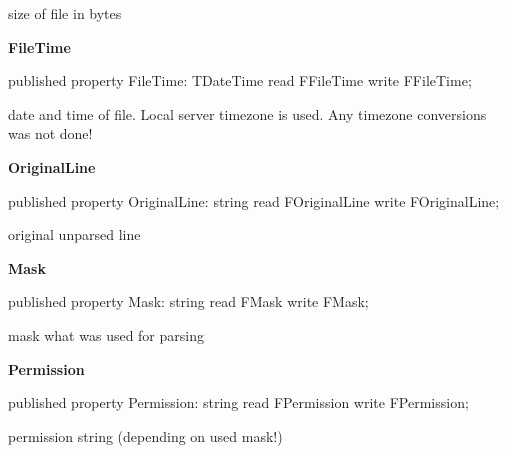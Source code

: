 \documentclass{report}
\newif\ifpdf
\begin{document}
\begin{list}{}
\begin{flushleft}
\ifpdf
\end{flushleft}
\fi


\par size of file in bytes\label{ftpsend.TFTPListRec-FileTime}
\item[\textbf{FileTime}\hfill]
\ifpdf
\begin{flushleft}
\fi
\begin{ttfamily}
published property FileTime: TDateTime read FFileTime write FFileTime;\end{ttfamily}

\ifpdf
\end{flushleft}
\fi


\par date and time of file. Local server timezone is used. Any timezone conversions was not done!\label{ftpsend.TFTPListRec-OriginalLine}
\item[\textbf{OriginalLine}\hfill]
\ifpdf
\begin{flushleft}
\fi
\begin{ttfamily}
published property OriginalLine: string read FOriginalLine write FOriginalLine;\end{ttfamily}

\ifpdf
\end{flushleft}
\fi


\par original unparsed line\label{ftpsend.TFTPListRec-Mask}
\item[\textbf{Mask}\hfill]
\ifpdf
\begin{flushleft}
\fi
\begin{ttfamily}
published property Mask: string read FMask write FMask;\end{ttfamily}

\ifpdf
\end{flushleft}
\fi


\par mask what was used for parsing\label{ftpsend.TFTPListRec-Permission}
\item[\textbf{Permission}\hfill]
\ifpdf
\begin{flushleft}
\fi
\begin{ttfamily}
published property Permission: string read FPermission write FPermission;\end{ttfamily}

\ifpdf
\end{flushleft}
\fi


\par permission string (depending on used mask!)\end{list}
\end{document}
